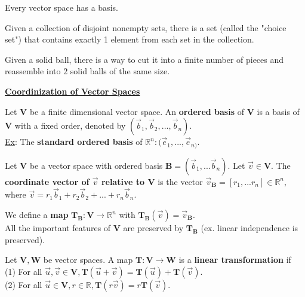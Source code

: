 \documentclass{article}
\begin{document}
\begin{theorem}
Every vector space has a basis.
\end{theorem}
\begin{theorem}
Given a collection of disjoint nonempty sets, there is a set (called the "choice set") that contains exactly 1 element from each set in the collection.
\end{theorem}

\begin{theorem}
Given a solid ball, there is a way to cut it into a finite number of pieces and reassemble into $2$ solid balls of the same size.

\end{theorem}

\newpage


\underline{\textbf{Coordinization of Vector Spaces}}
\begin{definition}
Let $\boldsymbol{V}$ be a finite dimensional vector space. An \textbf{ordered basis} of $\boldsymbol{V}$ is a basis of $\boldsymbol{V}$ with a  fixed order, denoted by $(\vec{b}_{1}, \vec{b}_{2}, ..., \vec{b}_{n}).$ \\
\underline{Ex}: The \textbf{standard ordered basis} of $\mathbb{R}^n: (\vec{e}_{1}, ..., \vec{e}_{n)}.$
\end{definition}

\begin{definition}
Let $\boldsymbol{V}$ be a vector space with ordered basis $\boldsymbol{B} = (\vec{b}_{1}, ... \vec{b}_{n}).$ Let $\vec{v} \in \boldsymbol{V}.$ The \textbf{coordinate vector of $\vec{v}$ relative to $\boldsymbol{V}$} is the vector $\vec{v}_{\boldsymbol{B}} = [r_1, ... r_n] \in \mathbb{R}^n,$ where $\vec{v} = r_1\vec{b}_{1} + r_2\vec{b}_{2} + ... + r_n\vec{b}_{n}.$
\end{definition}

\begin{definition}
We define a \textbf{map} $\boldsymbol{T}_{\boldsymbol{B}}: \boldsymbol{V} \rightarrow \mathbb{R}^n$ with $\boldsymbol{T}_{\boldsymbol{B}}(\vec{v}) = \vec{v}_{\boldsymbol{B}}.$ \\
All the important features of $\boldsymbol{V}$ are preserved by $\boldsymbol{T}_{\boldsymbol{B}}$ (ex. linear independence is preserved).
\end{definition}

\begin{definition}
Let $\boldsymbol{V, W}$ be vector spaces. A map $\boldsymbol{T}: \boldsymbol{V} \rightarrow \boldsymbol{W}$ is a \textbf{linear transformation} if \\
(1) For all $\vec{u}, \vec{v} \in \boldsymbol{V}, \boldsymbol{T}(\vec{u} + \vec{v}) = \boldsymbol{T}(\vec{u}) + \boldsymbol{T}(\vec{v})$. \\
(2) For all $\vec{u} \in \boldsymbol{V}, r \in \mathbb{R}, \boldsymbol{T}(r\vec{v}) = r\boldsymbol{T}(\vec{v}).$
\end{definition}
\end{document}
